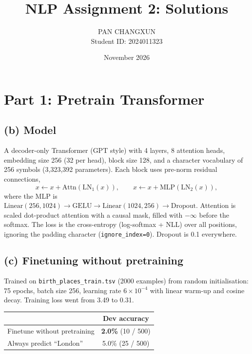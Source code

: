 \documentclass[11pt]{article}
\title{NLP Assignment 2: Solutions}
\author{PAN CHANGXUN\\Student ID: 2024011323}
\date{November 2026}
\begin{document}
\maketitle
\vspace{-2em}

\section*{Part 1: Pretrain Transformer}

\subsection*{(b) Model}

A decoder-only Transformer (GPT style) with
4 layers, 8 attention heads, embedding size 256 (32 per head),
block size 128, and a character vocabulary of 256 symbols
(3{,}323{,}392 parameters).
Each block uses pre-norm residual connections,
\[
x \leftarrow x + \mathrm{Attn}(\mathrm{LN}_1(x)),\qquad
x \leftarrow x + \mathrm{MLP}(\mathrm{LN}_2(x)),
\]
where the MLP is $\mathrm{Linear}(256,1024)\to\mathrm{GELU}\to\mathrm{Linear}(1024,256)\to\mathrm{Dropout}$.
Attention is scaled dot-product attention with a causal mask, filled with
$-\infty$ before the softmax.
The loss is the cross-entropy (log-softmax + NLL) over all positions,
ignoring the padding character (\texttt{ignore\_index=0}).
Dropout is 0.1 everywhere.


\subsection*{(c) Finetuning without pretraining}

Trained on \texttt{birth\_places\_train.tsv} (2000 examples) from random
initialisation: 75 epochs, batch size 256, learning rate $6\times10^{-4}$
with linear warm-up and cosine decay. Training loss went from 3.49 to 0.31.

\begin{center}
\begin{tabular}{lc}
\toprule
 & Dev accuracy \\
\midrule
Finetune without pretraining & \textbf{2.0\%} (10 / 500) \\
Always predict ``London'' & 5.0\% (25 / 500) \\
\bottomrule
\end{tabular}
\end{center}
\end{document}
